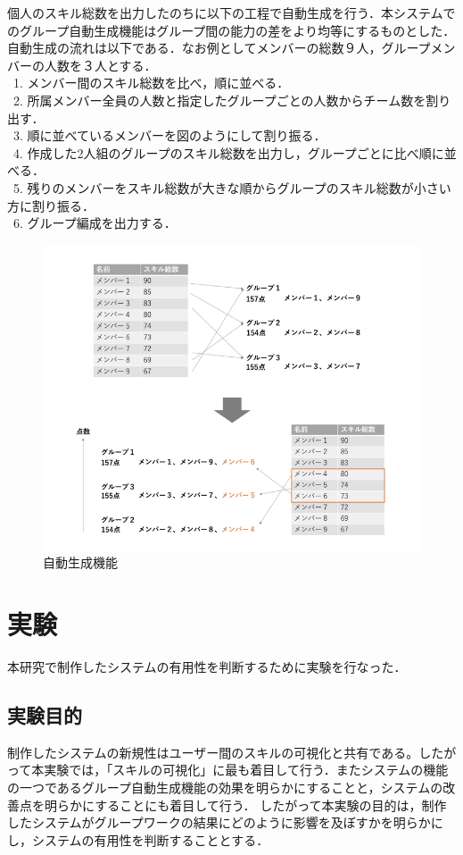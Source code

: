\documentclass{funthesis}
\begin{document}
個人のスキル総数を出力したのちに以下の工程で自動生成を行う．本システムでのグループ自動生成機能はグループ間の能力の差をより均等にするものとした．自動生成の流れは以下である．なお例としてメンバーの総数９人，グループメンバーの人数を３人とする．\\
\ 1. メンバー間のスキル総数を比べ，順に並べる．\\
\ 2. 所属メンバー全員の人数と指定したグループごとの人数からチーム数を割り出す．\\
\ 3. 順に並べているメンバーを図のようにして割り振る．\\
\ 4. 作成した2人組のグループのスキル総数を出力し，グループごとに比べ順に並べる．\\
\ 5. 残りのメンバーをスキル総数が大きな順からグループのスキル総数が小さい方に割り振る．\\
\ 6. グループ編成を出力する．\\
\begin{figure}[h]
 \centering
   \includegraphics[width=150mm]{figures/auto.png}
 \caption{自動生成機能}
 \label{auto}
\end{figure}





\chapter{実験}
本研究で制作したシステムの有用性を判断するために実験を行なった．
\section{実験目的}
制作したシステムの新規性はユーザー間のスキルの可視化と共有である。したがって本実験では，「スキルの可視化」に最も着目して行う．またシステムの機能の一つであるグループ自動生成機能の効果を明らかにすることと，システムの改善点を明らかにすることにも着目して行う．
したがって本実験の目的は，制作したシステムがグループワークの結果にどのように影響を及ぼすかを明らかにし，システムの有用性を判断することとする．
\end{document}

